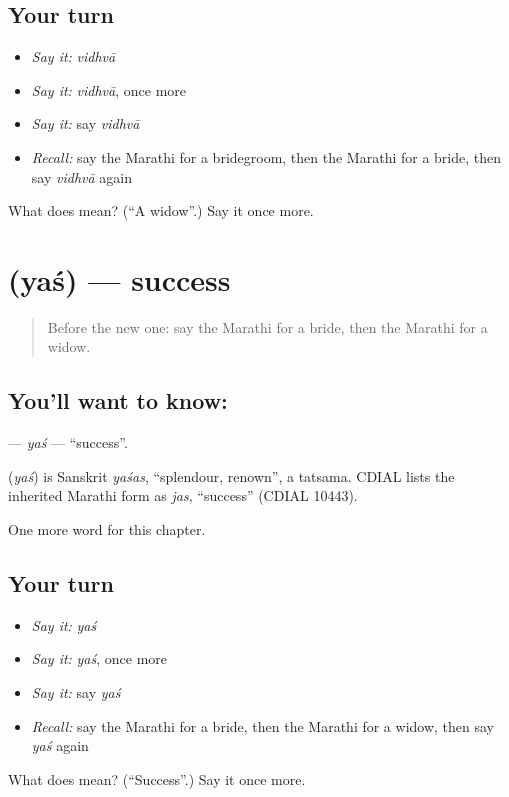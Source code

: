 \subsection*{Your turn}
\begin{itemize}
\raggedright
  \item \emph{Say it:} \emph{vidhvā}
  \item \emph{Say it:} \emph{vidhvā}, once more
  \item \emph{Say it:} say \emph{vidhvā}
  \item \emph{Recall:} say the Marathi for a bridegroom, then the Marathi for a bride, then say \emph{vidhvā} again
\end{itemize}

\begin{tcolorbox}[breakable,colback=teal!4,colframe=teal!35!black,title={Before you move on}]
What does  mean? (\textquotedblleft{}A widow\textquotedblright{}.) Say it once more.
\end{tcolorbox}
\section[\texorpdfstring{\mr{यश} (yaś)}{यश (yaś)}]{ (yaś) — success}

\label{lesson:MR-C181-yas}



\begin{quote}
Before the new one: say the Marathi for a bride, then the Marathi for a widow.
\end{quote}

\subsection*{You'll want to know: }
\textbf{} — \emph{yaś} — \textquotedblleft{}success\textquotedblright{}.

\begin{cousinweb}
\textbf{} (\emph{yaś}) is Sanskrit \emph{yaśas}, \textquotedblleft{}splendour, renown\textquotedblright{}, a tatsama. CDIAL lists the inherited Marathi form as \emph{jas}, \textquotedblleft{}success\textquotedblright{} (CDIAL 10443).
\end{cousinweb}

\begin{grammarlens}[title={What you've built}]
One more word for this chapter.
\end{grammarlens}

\subsection*{Your turn}
\begin{itemize}
\raggedright
  \item \emph{Say it:} \emph{yaś}
  \item \emph{Say it:} \emph{yaś}, once more
  \item \emph{Say it:} say \emph{yaś}
  \item \emph{Recall:} say the Marathi for a bride, then the Marathi for a widow, then say \emph{yaś} again
\end{itemize}

\begin{tcolorbox}[breakable,colback=teal!4,colframe=teal!35!black,title={Before you move on}]
What does  mean? (\textquotedblleft{}Success\textquotedblright{}.) Say it once more.
\end{tcolorbox}
